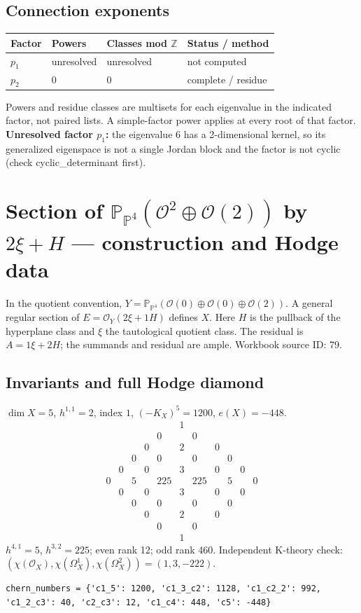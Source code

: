 \documentclass[10pt,a4paper]{article}
\begin{document}
\subsection*{Connection exponents}
\begin{center}\begin{tabular}{llll}\toprule Factor & Powers & Classes mod $\mathbb Z$ & Status / method\\\midrule
$p_{1}$ & unresolved & unresolved & not computed\\
$p_{2}$ & $0$ & $0$ & complete / residue\\
\bottomrule\end{tabular}\end{center}
Powers and residue classes are multisets for each eigenvalue in the indicated factor, not paired lists. A simple-factor power applies at every root of that factor.
\textbf{Unresolved factor $p_{1}$:} the eigenvalue 6 has a 2-dimensional kernel, so its generalized eigenspace is not a single Jordan block and the factor is not cyclic (check cyclic\_determinant first).
\clearpage\section*{Section of $\mathbb P_{\mathbb P^{4}}(\mathcal O^{2}\oplus \mathcal O(2))$ by $2\xi +H$ --- construction and Hodge data}\label{entry:PB5-079}
In the quotient convention, $Y=\mathbb P_{\mathbb P^{4}}(\mathcal O(0)\oplus\mathcal O(0)\oplus\mathcal O(2))$.
A general regular section of $E=\mathcal O_Y(2\xi+1H)$ defines $X$.
Here $H$ is the pullback of the hyperplane class and $\xi$ the tautological quotient class. The residual is $A=1\xi+2H$; the summands and residual are ample.
Workbook source ID: 79.
\subsection*{Invariants and full Hodge diamond}
$\dim X=5$, $h^{1,1}=2$, index $1$, $(-K_X)^5=1200$, $e(X)=-448$.
\[\begin{array}{ccccccccccc}&&&&&1&&&&&\\&&&&0&&0&&&&\\&&&0&&2&&0&&&\\&&0&&0&&0&&0&&\\&0&&0&&3&&0&&0&\\0&&5&&225&&225&&5&&0\\&0&&0&&3&&0&&0&\\&&0&&0&&0&&0&&\\&&&0&&2&&0&&&\\&&&&0&&0&&&&\\&&&&&1&&&&&\end{array}\]
$h^{4,1}=5$, $h^{3,2}=225$; even rank 12; odd rank 460.
Independent K-theory check: $(\chi(\mathcal O_X),\chi(\Omega_X^1),\chi(\Omega_X^2))=(1, 3, -222)$.
\begin{lstlisting}
chern_numbers = {'c1_5': 1200, 'c1_3_c2': 1128, 'c1_c2_2': 992, 'c1_2_c3': 40, 'c2_c3': 12, 'c1_c4': 448, 'c5': -448}
\end{lstlisting}
\end{document}
